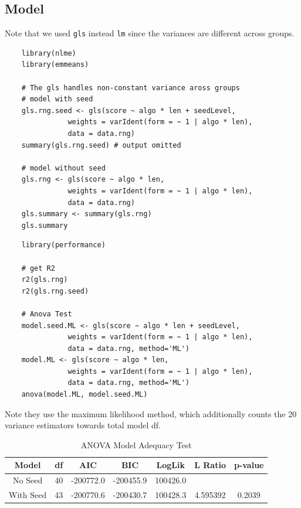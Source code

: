 \documentclass{report}
\begin{document}
\subsection{Model}
Note that we used \texttt{gls} instead \texttt{lm} since the variances are different across groups.
\begin{mdframed}
\begin{lstlisting}
    library(nlme)
    library(emmeans)

    # The gls handles non-constant variance aross groups
    # model with seed
    gls.rng.seed <- gls(score ~ algo * len + seedLevel,
               weights = varIdent(form = ~ 1 | algo * len), 
               data = data.rng)
    summary(gls.rng.seed) # output omitted

    # model without seed
    gls.rng <- gls(score ~ algo * len,
               weights = varIdent(form = ~ 1 | algo * len), 
               data = data.rng)
    gls.summary <- summary(gls.rng)
    gls.summary
\end{lstlisting}
\end{mdframed}
\begin{mdframed}\label{R:AnovaON2Models}
\begin{lstlisting}
    library(performance)

    # get R2
    r2(gls.rng)
    r2(gls.rng.seed)

    # Anova Test
    model.seed.ML <- gls(score ~ algo * len + seedLevel,
               weights = varIdent(form = ~ 1 | algo * len), 
               data = data.rng, method='ML')
    model.ML <- gls(score ~ algo * len,
               weights = varIdent(form = ~ 1 | algo * len), 
               data = data.rng, method='ML')
    anova(model.ML, model.seed.ML)
\end{lstlisting}
\end{mdframed}

Note they use the maximum likelihood method, which additionally counts the 20 variance estimators towards total model df.

\begin{table}[h]
    \centering
    \begin{tabular}{ccccccc}
    \hline
    Model & df & AIC & BIC & LogLik & L Ratio & p-value\\ \hline
    No Seed & 40 & -200772.0 & -200455.9 & 100426.0 & &\\		
    With Seed & 43 & -200770.6 & -200430.7 & 100428.3 &	4.595392 & 0.2039\\ \hline
    \end{tabular}
    \caption{ANOVA Model Adequacy Test}
    \label{tab:ANOVA2ModelTest}
\end{table}
\end{document}
